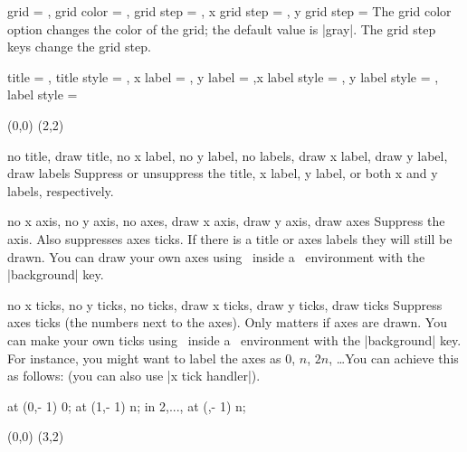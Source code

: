 \begin{sseqdata}[|| name = ex1, cohomological Serre grading]
\begin{keylist}{
    grid = ,
    grid color = ,
    grid step = ,
    x grid step = ,
    y grid step = 
}
The grid color option changes the color of the grid; the default value is |gray|.
The grid step keys change the grid step.
\end{keylist}

\begin{keylist}{title = , title style = , x label = , y label = ,x label style = , y label style = , label style = }
\begin{codeexample}[width = 6cm]
\begin{sseqpage}[ title = { An example }, yscale = 0.5,
    x label = { x axis label },
    y label = { y axis label },
    label style = { blue, font = \small },
    x label style = { yshift = 5pt },
    ]
\class(0,0)
\class(2,2)
\end{sseqpage}
\end{codeexample}
\end{keylist}


\begin{keylist}{no title, draw title, no x label, no y label, no labels, draw x label, draw y label, draw labels}
Suppress or unsuppress the title, x label, y label, or both x and y labels, respectively.
\end{keylist}

\begin{keylist}{no x axis, no y axis, no axes, draw x axis, draw y axis, draw axes}
Suppress the axis. Also suppresses axes ticks. If there is a title or axes labels they will still be drawn. You can draw your own axes using \tikzpkg\  inside a \scopeenv\  environment with the |background| key.
\end{keylist}

\begin{keylist}{no x ticks, no y ticks, no ticks, draw x ticks, draw y ticks, draw ticks}
Suppress axes ticks (the numbers next to the axes). Only matters if axes are drawn. You can make your own ticks using \tikzpkg\  inside a \scopeenv\  environment with the |background| key. For instance, you might want to label the axes as 0, $n$, $2n$, \ldots You can achieve this as follows: (you can also use |x tick handler|).
\begin{codeexample}[width = 5.7cm]
\begin{sseqpage}[ no x ticks, x range = {0}{3} ]
\begin{scope}[ background ]
    \node at (0,\ymin - 1) {0};
    \node at (1,\ymin - 1) {\protect\vphantom{2}n};
\foreach \n in {2,..., \xmax}{
    \node at (\n,\ymin - 1) {\n n};
}
\end{scope}
\class(0,0)
\class(3,2)
\end{sseqpage}
\end{codeexample}
\end{keylist}


\end{sseqdata}
